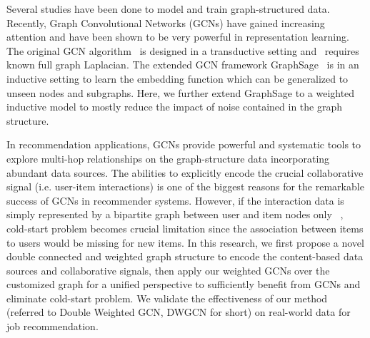 \documentclass[manuscript,screen,review]{acmart}
\begin{document}
Several studies have been done to model and train graph-structured data.  Recently, Graph Convolutional Networks (GCNs) \cite{kipf2016variational,kipf2016semi,hamilton2017inductive} have gained increasing attention and have been shown to be very powerful in representation learning. The original GCN algorithm~\cite{kipf2016semi} is designed in a transductive setting and~\cite{kipf2016variational} requires known full graph Laplacian. The extended GCN framework GraphSage~\cite{kipf2016variational} is in an inductive setting to learn the embedding function which can be generalized to unseen nodes and subgraphs. Here, we further extend GraphSage to a weighted inductive model to mostly reduce the impact of noise contained in the graph structure.  

In recommendation applications, GCNs provide powerful and systematic tools to explore multi-hop relationships on the graph-structure data incorporating abundant data sources. The abilities to explicitly encode the crucial collaborative signal (i.e. user-item interactions) is one of the biggest reasons for the remarkable success of GCNs in recommender systems. However, if the interaction data is simply represented by a bipartite graph between user and item nodes only ~\cite{ying2018graph,eksombatchai2018pixie}, cold-start problem becomes crucial limitation since the association between items to users would be missing for new items. In this research, we first propose a novel double connected and weighted graph structure to encode the content-based data sources and collaborative signals, then apply our weighted GCNs over the customized graph for a unified perspective to sufficiently benefit from GCNs and eliminate cold-start problem. We validate the effectiveness of our method (referred to Double Weighted GCN, DWGCN for short) on real-world data for job recommendation.


\end{document}
